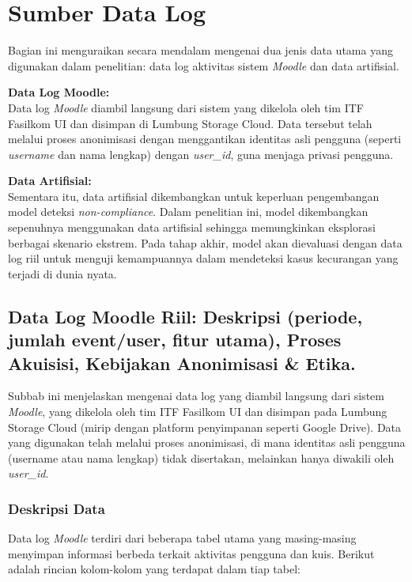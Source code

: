 \section{Sumber Data Log}
\label{sec:sumberDataLog}
Bagian ini menguraikan secara mendalam mengenai dua jenis data utama yang digunakan dalam penelitian: data log aktivitas sistem \textit{Moodle} dan data artifisial. 

\textbf{Data Log Moodle:} \\
Data log \textit{Moodle} diambil langsung dari sistem yang dikelola oleh tim ITF Fasilkom UI dan disimpan di Lumbung Storage Cloud. Data tersebut telah melalui proses anonimisasi dengan menggantikan identitas asli pengguna (seperti \textit{username} dan nama lengkap) dengan \textit{user\_id}, guna menjaga privasi pengguna.

\textbf{Data Artifisial:} \\
Sementara itu, data artifisial dikembangkan untuk keperluan pengembangan model deteksi \textit{non-compliance}. Dalam penelitian ini, model dikembangkan sepenuhnya menggunakan data artifisial sehingga memungkinkan eksplorasi berbagai skenario ekstrem. Pada tahap akhir, model akan dievaluasi dengan data log riil untuk menguji kemampuannya dalam mendeteksi kasus kecurangan yang terjadi di dunia nyata.

\subsection{Data Log Moodle Riil: Deskripsi (periode, jumlah event/user, fitur utama), Proses Akuisisi, Kebijakan Anonimisasi \& Etika.}
\label{sec:logRiil}
Subbab ini menjelaskan mengenai data log yang diambil langsung dari sistem \textit{Moodle}, yang dikelola oleh tim ITF Fasilkom UI dan disimpan pada Lumbung Storage Cloud (mirip dengan platform penyimpanan seperti Google Drive). Data yang digunakan telah melalui proses anonimisasi, di mana identitas asli pengguna (username atau nama lengkap) tidak disertakan, melainkan hanya diwakili oleh \textit{user\_id}.

\subsubsection{Deskripsi Data}
\label{sec:deskripsiData}
Data log \textit{Moodle} terdiri dari beberapa tabel utama yang masing-masing menyimpan informasi berbeda terkait aktivitas pengguna dan kuis. Berikut adalah rincian kolom-kolom yang terdapat dalam tiap tabel:

